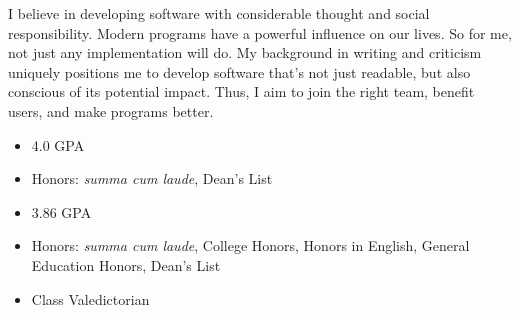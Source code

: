 \documentclass[
  letterpaper, 
   topbottommargin=0.03\paperheight,
   leftrightmargin=20pt,
]{fortysecondscv}
\begin{document}
\makefrontsidebar

\vspace*{-1em}

    I believe in developing software with considerable thought and social responsibility. Modern programs have a powerful influence on our lives. So for me, not just any implementation will do. My background in writing and criticism uniquely positions me to develop software that's not just readable, but also conscious of its potential impact. Thus, I aim to join the right team, benefit users, and make programs better.


\begin{cvtable}%
		{
		\vspace{-2em}
		\begin{itemize}[noitemsep]
		    \item 4.0 GPA
		    \item Honors: \textit{summa cum laude}, Dean's List
		\end{itemize}
		}
		{
		\vspace{-2em}
		\begin{itemize}[noitemsep]
		    \item 3.86 GPA
		    \item Honors: \textit{summa cum laude}, College Honors, Honors in English, General Education Honors, Dean’s List
		\end{itemize}
		}
		{
		\vspace{-2em}
		\begin{itemize}[noitemsep]
		    \item Class Valedictorian
		\end{itemize}
		}
\end{cvtable}
\end{document}
